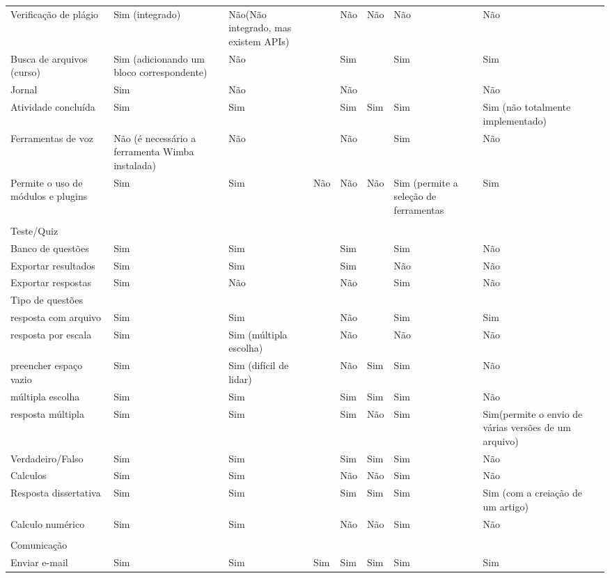 \begin{table}[h]
\begin{tabular}{@{}lllllllll@{}}
Verificação de plágio & Sim (integrado) & Não(Não integrado, mas existem APIs) &  & Não & Não & Não & Não &  \\
Busca de arquivos (curso) & Sim (adicionando um bloco correspondente) & Não &  & Sim &  & Sim & Sim &  \\
Jornal & Sim & Não &  & Não &  &  & Não &  \\
Atividade concluída & Sim & Sim &  & Sim & Sim & Sim & Sim (não totalmente implementado) &  \\
Ferramentas de voz & Não (é necessário a ferramenta Wimba instalada) & Não &  & Não &  & Sim & Não &  \\
Permite o uso de módulos e plugins & Sim & Sim & Não & Não & Não & Sim (permite a seleção de ferramentas & Sim &  \\
 &  &  &  &  &  &  &  &  \\
Teste/Quiz &  &  &  &  &  &  &  &  \\
Banco de questões & Sim & Sim &  & Sim &  & Sim & Não &  \\
Exportar resultados & Sim & Sim &  & Sim &  & Não & Não &  \\
Exportar respostas & Sim & Não &  & Não &  & Sim & Não &  \\
Tipo de questões &  &  &  &  &  &  &  &  \\
resposta com arquivo & Sim & Sim &  & Não &  & Sim & Sim &  \\
resposta por escala & Sim & Sim (múltipla escolha) &  & Não &  & Não & Não &  \\
preencher espaço vazio & Sim & Sim (difícil de lidar) &  & Não & Sim & Sim & Não &  \\
múltipla escolha & Sim & Sim &  & Sim & Sim & Sim & Não &  \\
resposta múltipla & Sim & Sim &  & Sim & Não & Sim & Sim(permite o envio de várias versões de um arquivo) &  \\
Verdadeiro/Falso & Sim & Sim &  & Sim & Sim & Sim & Não &  \\
Calculos & Sim & Sim &  & Não & Não & Sim & Não &  \\
Resposta dissertativa & Sim & Sim &  & Sim & Sim & Sim & Sim (com a creiação de um artigo) &  \\
Calculo numérico & Sim & Sim &  & Não & Não & Sim & Não &  \\
 &  &  &  &  &  &  &  &  \\
Comunicação &  &  &  &  &  &  &  &  \\
Enviar e-mail & Sim & Sim & Sim & Sim & Sim & Sim & Sim &  \\

\end{tabular}
\end{table}
